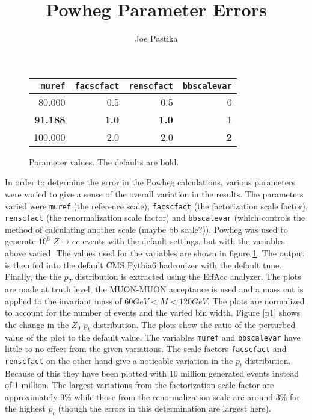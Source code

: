 \documentclass{article}
\begin{document}
\title{Powheg Parameter Errors}
\author{Joe Pastika}
\maketitle

\begin{figure}[b]
	\begin{center}
    \begin{tabular}{ | r | r | r | r | }
        \hline
         {\tt muref} & {\tt facscfact} & {\tt renscfact} & {\tt bbscalevar} \\
        \hline \hline
		80.000 & 0.5 & 0.5 & 0 \\
        \hline 
        \bf{91.188} & \bf{1.0} & \bf{1.0} & 1 \\
        \hline
        100.000 & 2.0 & 2.0 & \bf{2} \\
        \hline
    \end{tabular}
    \caption{Parameter values.  The defaults are bold.}
    \label{fig1}
    \end{center}
\end{figure}

In order to determine the error in the Powheg calculations, various parameters were varied to give a sense of the overall variation in the results.  The parameters varied were {\tt muref} (the reference scale), {\tt facscfact} (the factorization scale factor), {\tt renscfact} (the renormalization scale factor) and {\tt bbscalevar} (which controls the method of calculating another scale (maybe bb scale?)).  Powheg was used to generate $10^{6}$ $Z\rightarrow ee$ events with the default settings, but with the variables above varied.  The values used for the variables are shown in figure \ref{fig1}.  The output is then fed into the default CMS Pythia6 hadronizer with the default tune.  Finally, the the $p_{T}$ distribution is extracted using the EffAcc analyzer.  The plots are made at truth level, the MUON-MUON acceptance is used and a mass cut is applied to the invariant mass of $60 GeV < M < 120 GeV$.  The plots are normalized to account for the number of events and the varied bin width.  Figure \ref{p1} shows the change in the $Z_{0}$ $p_{t}$ distribution.  The plots show the ratio of the perturbed value of the plot to the default value.  The variables {\tt muref} and {\tt bbscalevar} have little to no effect from the given variations.  The scale factors {\tt facscfact} and {\tt renscfact} on the other hand give a noticable variation in the $p_{t}$ distribution.  Because of this they have been plotted with 10 million generated events instead of 1 million.  The largest variations from the factorization scale factor are approximately 9\% while those from the renormalization scale are around 3\% for the highest $p_{t}$ (though the errors in this determination are largest here).  
\end{document}
